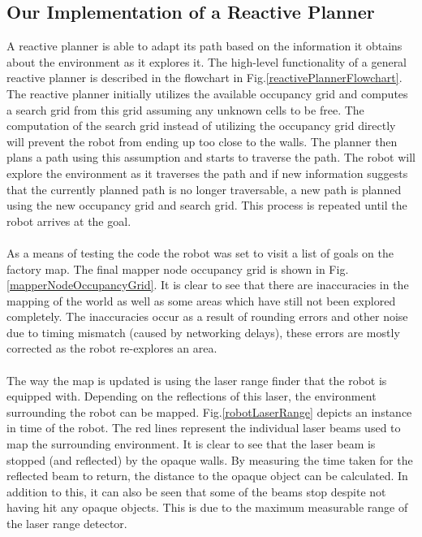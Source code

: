 \documentclass[a4paper,12pt]{article}
\begin{document}
		\subsection{Our Implementation of a Reactive Planner}

			A reactive planner is able to adapt its path based on the information it obtains about the environment as it explores it. The high-level functionality of a general reactive planner is described in the flowchart in Fig.\ref{reactivePlannerFlowchart}. The reactive planner initially utilizes the available occupancy grid and computes a search grid from this grid assuming any unknown cells to be free. The computation of the search grid instead of utilizing the occupancy grid directly will prevent the robot from ending up too close to the walls. The planner then plans a path using this assumption and starts to traverse the path. The robot will explore the environment as it traverses the path and if new information suggests that the currently planned path is no longer traversable, a new path is planned using the new occupancy grid and search grid. This process is repeated until the robot arrives at the goal.
			\\
			\\
			As a means of testing the code the robot was set to visit a list of goals on the factory map. The final mapper node occupancy grid is shown in Fig.\ref{mapperNodeOccupancyGrid}. It is clear to see that there are inaccuracies in the mapping of the world as well as some areas which have still not been explored completely. The inaccuracies occur as a result of rounding errors and other noise due to timing mismatch (caused by networking delays), these errors are mostly corrected as the robot re-explores an area.
			\\
			\\
			The way the map is updated is using the laser range finder that the robot is equipped with. Depending on the reflections of this laser, the environment surrounding the robot can be mapped. Fig.\ref{robotLaserRange} depicts an instance in time of the robot. The red lines represent the individual laser beams used to map the surrounding environment. It is clear to see that the laser beam is stopped (and reflected) by the opaque walls. By measuring the time taken for the reflected beam to return, the distance to the opaque object can be calculated. In addition to this, it can also be seen that some of the beams stop despite not having hit any opaque objects. This is due to the maximum measurable range of the laser range detector. 
\end{document}
